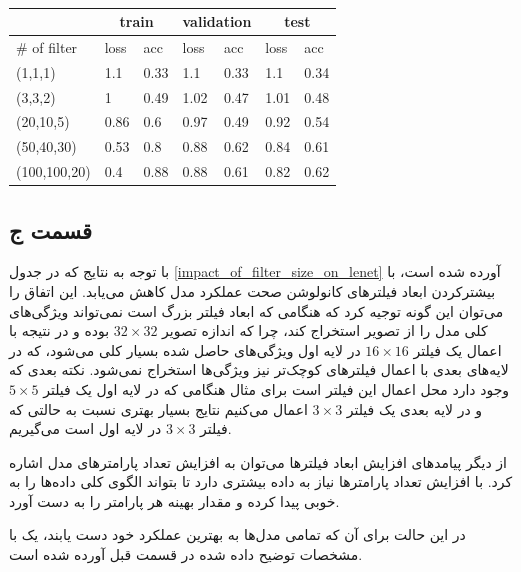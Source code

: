 \documentclass[12pt, a4paper]{article}
\begin{document}
\begin{latin}
\begin{table}[h]
    \centering
    \caption{}
    \label{impact_of_filter_count_on_lenet}
    \begin{tabular}{l||l|l||l|l||l|l}
        & \multicolumn{2}{c||}{train} & \multicolumn{2}{c||}{validation} & \multicolumn{2}{c}{test}\\ \hline
        \# of filter & loss & acc & loss & acc & loss & acc \\ \hline
        (1,1,1) & 1.1 & 0.33 & 1.1 & 0.33 & 1.1 & 0.34 \\ \hline
        (3,3,2) & 1 & 0.49 & 1.02 & 0.47 & 1.01 & 0.48 \\ \hline
        (20,10,5) & 0.86 & 0.6 & 0.97 & 0.49 & 0.92 & 0.54 \\ \hline
        (50,40,30) & 0.53 & 0.8 & 0.88 & 0.62 & 0.84 & 0.61\\ \hline
        (100,100,20) & 0.4 & 0.88 & 0.88 & 0.61 & 0.82 & 0.62
    \end{tabular}
\end{table}
\end{latin}

\subsection*{قسمت ج}

با توجه به نتایج که در جدول \ref{impact_of_filter_size_on_lenet} آورده شده است، با بیشترکردن ابعاد فیلتر‌های کانولوشن
صحت عملکرد مدل کاهش می‌یابد. این اتفاق را می‌توان این گونه توجیه کرد که هنگامی که ابعاد فیلتر بزرگ است
نمی‌تواند ویژگی‌های کلی مدل را از تصویر استخراج کند، چرا که اندازه تصویر $32 \times 32$ بوده و در نتیجه
با اعمال یک فیلتر $16 \times 16$ در لایه اول ویژگی‌های حاصل شده بسیار کلی می‌شود، که در لایه‌های بعدی با اعمال
فیلتر‌های کوچک‌تر نیز ویژگی‌ها استخراج نمی‌شود. نکته بعدی که وجود دارد محل اعمال این فیلتر است برای مثال هنگامی که
در لایه اول یک فیلتر $5 \times 5$ و در لایه بعدی یک فیلتر $3 \times 3$ اعمال می‌کنیم نتایج بسیار بهتری نسبت به حالتی که
فیلتر $3 \times 3$ در لایه اول است می‌گیریم.

از دیگر پیامد‌های افزایش ابعاد فیلتر‌ها می‌توان به افزایش تعداد پارامتر‌های مدل اشاره کرد. با افزایش تعداد پارامتر‌ها
نیاز به داده بیشتری دارد تا بتواند الگوی کلی داده‌ها را به خوبی پیدا کرده و مقدار بهینه هر پارامتر را به دست آورد.

در این حالت برای آن که تمامی مدل‌ها به بهترین عملکرد خود دست یابند، یک  با مشخصات توضیح داده شده
در قسمت قبل آورده شده است.
\end{document}
